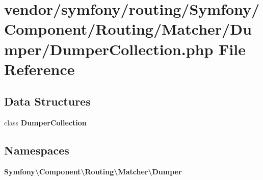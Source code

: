 \section{vendor/symfony/routing/\+Symfony/\+Component/\+Routing/\+Matcher/\+Dumper/\+Dumper\+Collection.php File Reference}
\label{_dumper_collection_8php}
\subsection*{Data Structures}
\begin{DoxyCompactItemize}
\item 
class {\bf Dumper\+Collection}
\end{DoxyCompactItemize}
\subsection*{Namespaces}
\begin{DoxyCompactItemize}
\item 
 {\bf Symfony\textbackslash{}\+Component\textbackslash{}\+Routing\textbackslash{}\+Matcher\textbackslash{}\+Dumper}
\end{DoxyCompactItemize}

